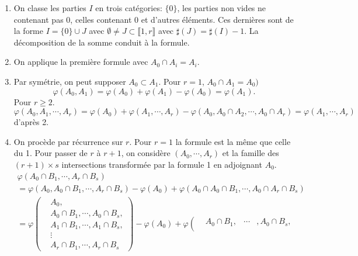 \begin{demo}
  \begin{enumerate}
    \item On classe les parties $I$ en trois catégories: $\{ 0 \}$, les parties non vides ne contenant pas $0$, celles contenant $0$ et d'autres éléments. Ces dernières sont de la forme $I = \{ 0 \}\cup J$ avec $\emptyset \neq J \subset \llbracket 1, r \rrbracket$ avec $\sharp(J) = \sharp(I) -1$. La décomposition de la somme conduit à la formule.
    \item On applique la première formule avec $A_0 \cap A_i = A_i$.
    \item Par symétrie, on peut supposer $A_0 \subset A_1$. Pour $r = 1$, $A_0 \cap A_1 = A_0)$
    \begin{displaymath}
      \varphi(A_0, A_1) = \varphi(A_0) + \varphi(A_1) - \varphi(A_0) = \varphi(A_1).
    \end{displaymath}
    Pour $r\geq 2$.
    \begin{displaymath}
      \varphi(A_0,A_1, \cdots,A_r) = \varphi(A_0) + \varphi(A_1, \cdots,A_r) - \varphi(A_0,A_0 \cap A_2, \cdots , A_0\cap A_r) = \varphi(A_1, \cdots,A_r)
    \end{displaymath}
    d'après 2.
    \item On procède par récurrence sur $r$. Pour $r=1$ la formule est la même que celle du 1.\newline
    Pour passer de $r$ à $r+1$, on considère $(A_0, \cdots,A_r)$ et la famille des $(r+1)\times s$ intersections transformée par la formule 1 en adjoignant $A_0$.
    \begin{multline*}
      \varphi(A_0\cap B_1, \cdots, A_r \cap B_s) \\
      = \varphi(A_0, A_0\cap B_1, \cdots, A_r \cap B_s) -\varphi(A_0) + \varphi(A_0\cap A_0\cap B_1, \cdots, A_0\cap A_r \cap B_s)\\
      = \varphi \left(
      \begin{aligned}
      &A_0, \\
      &A_0 \cap B_1, \cdots, A_0\cap B_s, \\
      &A_1 \cap B_1, \cdots, A_1\cap B_s, \\
      & \vdots  \\
      &A_r \cap B_1, \cdots, A_r\cap B_s
      \end{aligned}
      \right)
      -\varphi(A_0)
      + \varphi \left(
      \begin{aligned}
        & A_0\cap B_1, &\cdots &, A_0 \cap B_s, \\

\end{aligned}
\end{multline*}
\end{enumerate}
\end{demo}
